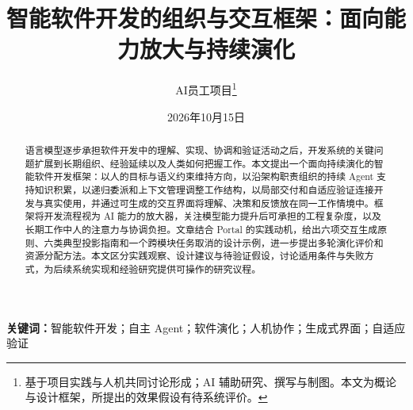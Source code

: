 \documentclass[UTF8,a4paper,12pt,fontset=none]{ctexart}
\title{智能软件开发的组织与交互框架：面向能力放大与持续演化}
\author{AI员工项目\thanks{基于项目实践与人机共同讨论形成；AI 辅助研究、撰写与制图。本文为概论与设计框架，所提出的效果假设有待系统评价。}}
\date{2026年10月15日}
\begin{document}
\maketitle
\begin{abstract}
语言模型逐步承担软件开发中的理解、实现、协调和验证活动之后，开发系统的关键问题扩展到长期组织、经验延续以及人类如何把握工作。本文提出一个面向持续演化的智能软件开发框架：以人的目标与语义约束维持方向，以沿架构职责组织的持续 Agent 支持知识积累，以递归委派和上下文管理调整工作结构，以局部交付和自适应验证连接开发与真实使用，并通过可生成的交互界面将理解、决策和反馈放在同一工作情境中。框架将开发流程视为 AI 能力的放大器，关注模型能力提升后可承担的工程复杂度，以及长期工作中人的注意力与协调负担。文章结合 Portal 的实践动机，给出六项交互生成原则、六类典型投影指南和一个跨模块任务取消的设计示例，进一步提出多轮演化评价和资源分配方法。本文区分实践观察、设计建议与待验证假设，讨论适用条件与失败方式，为后续系统实现和经验研究提供可操作的研究议程。
\end{abstract}
\noindent\textbf{关键词：}智能软件开发；自主 Agent；软件演化；人机协作；生成式界面；自适应验证
\clearpage
\setcounter{tocdepth}{2}
\tableofcontents











\clearpage
{}

\end{document}
